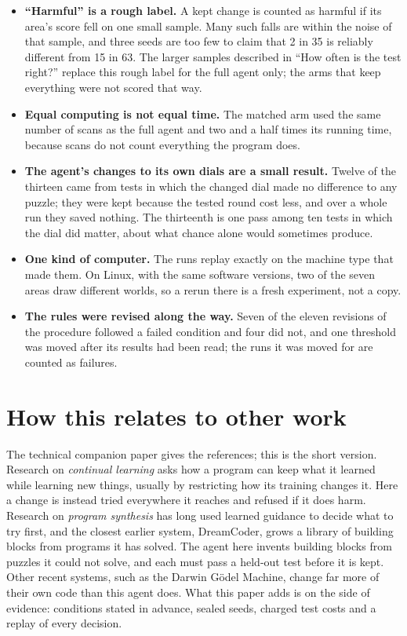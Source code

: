 \documentclass[11pt]{article}
\begin{document}
\begin{itemize}[leftmargin=*]
\item \textbf{``Harmful'' is a rough label.} A kept change is counted as harmful if its area's score fell on one small sample. Many such falls are within the noise of that sample, and three seeds are too few to claim that 2 in 35 is reliably different from 15 in 63. The larger samples described in ``How often is the test right?'' replace this rough label for the full agent only; the arms that keep everything were not scored that way.
\item \textbf{Equal computing is not equal time.} The matched arm used the same number of scans as the full agent and two and a half times its running time, because scans do not count everything the program does.
\item \textbf{The agent's changes to its own dials are a small result.} Twelve of the thirteen came from tests in which the changed dial made no difference to any puzzle; they were kept because the tested round cost less, and over a whole run they saved nothing. The thirteenth is one pass among ten tests in which the dial did matter, about what chance alone would sometimes produce.
\item \textbf{One kind of computer.} The runs replay exactly on the machine type that made them. On Linux, with the same software versions, two of the seven areas draw different worlds, so a rerun there is a fresh experiment, not a copy.
\item \textbf{The rules were revised along the way.} Seven of the eleven revisions of the procedure followed a failed condition and four did not, and one threshold was moved after its results had been read; the runs it was moved for are counted as failures.
\end{itemize}

\section{How this relates to other work}

The technical companion paper gives the references; this is the short version. Research on \emph{continual learning} asks how a program can keep what it learned while learning new things, usually by restricting how its training changes it. Here a change is instead tried everywhere it reaches and refused if it does harm. Research on \emph{program synthesis} has long used learned guidance to decide what to try first, and the closest earlier system, DreamCoder, grows a library of building blocks from programs it has solved. The agent here invents building blocks from puzzles it could not solve, and each must pass a held-out test before it is kept. Other recent systems, such as the Darwin G\"odel Machine, change far more of their own code than this agent does. What this paper adds is on the side of evidence: conditions stated in advance, sealed seeds, charged test costs and a replay of every decision.
\end{document}
